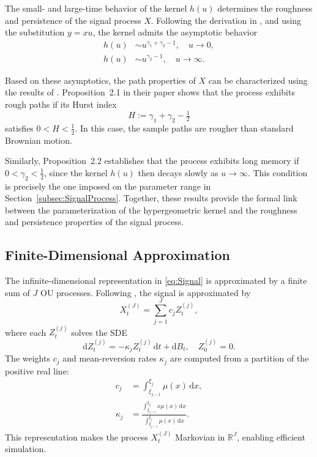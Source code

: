 The small- and large-time behavior of the kernel $h(u)$ determines the roughness and persistence of the signal process $X$. Following the derivation in \citet{Damian2021}, and using the substitution $y = xu$, the kernel admits the asymptotic behavior
\begin{align} \label{eq:KernelAsymptotics}
    h(u) &\sim u^{\gamma_1 + \gamma_2 - 1}, \quad u \to 0, \\
    h(u) &\sim u^{\gamma_2 - 1}, \quad u \to \infty.
\end{align}

Based on these asymptotics, the path properties of $X$ can be characterized using the results of \citet{BennedsenLundePakkanen2021}. Proposition~2.1 in their paper shows that the process exhibits rough paths if its Hurst index
\begin{equation} \label{eq:HurstIndex}
    H := \gamma_1 + \gamma_2 - \tfrac{1}{2}
\end{equation}
satisfies $0 < H < \tfrac{1}{2}$. In this case, the sample paths are rougher than standard Brownian motion. 

Similarly, Proposition~2.2 establishes that the process exhibits long memory if $0 < \gamma_2 < \tfrac{1}{2}$, since the kernel $h(u)$ then decays slowly as $u \to \infty$. This condition is precisely the one imposed on the parameter range in Section~\ref{subsec:SignalProcess}. Together, these results provide the formal link between the parameterization of the hypergeometric kernel and the roughness and persistence properties of the signal process.





\subsection{Finite-Dimensional Approximation} \label{subsec:FiniteDimApprox}

The infinite-dimensional representation in \eqref{eq:Signal} is approximated by a finite sum of $J$ OU processes. Following \citet{CarmonaCoutinMontseny2000}, the signal is approximated by
\begin{equation} \label{eq:FiniteApprox}
    X_t^{(J)} = \sum_{j=1}^J c_j Z_t^{(j)},
\end{equation}
where each $Z_t^{(j)}$ solves the SDE
\begin{equation}
    \mathrm{d} Z_t^{(j)} = -\kappa_j Z_t^{(j)} \,\mathrm{d}t + \mathrm{d}B_t, \quad Z_0^{(j)} = 0.
\end{equation}
The weights $c_j$ and mean-reversion rates $\kappa_j$ are computed from a partition of the positive real line:
\begin{align}
    c_j &= \int_{\xi_{j-1}}^{\xi_j} \mu(x) \,\mathrm{d}x, \label{eq:OUWeights} \\
    \kappa_j &= \frac{\int_{\xi_{j-1}}^{\xi_j} x \mu(x) \,\mathrm{d}x}{\int_{\xi_{j-1}}^{\xi_j} \mu(x) \,\mathrm{d}x}. \label{eq:OUSpeeds}
\end{align}
This representation makes the process $X_t^{(J)}$ Markovian in $\mathbb{R}^J$, enabling efficient simulation.

